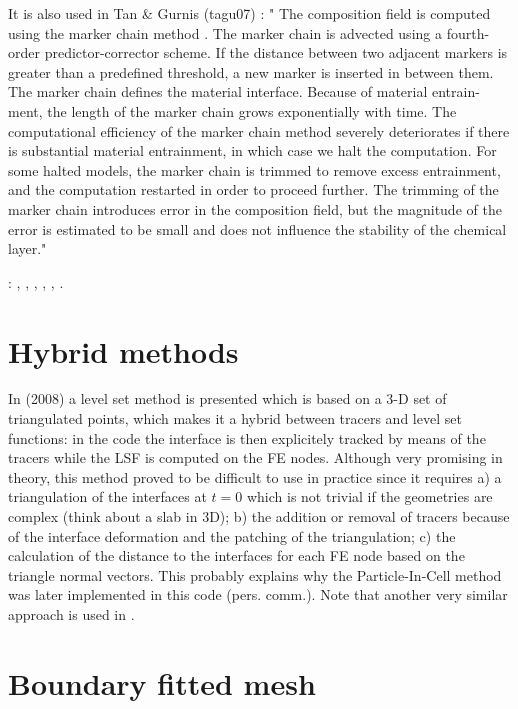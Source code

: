 It is also used in Tan \& Gurnis (tagu07) \cite{tagu07}: "
The composition field is computed using the marker
chain method \cite{dagu86,vaks97}. The marker chain is advected using a fourth-order
predictor-corrector scheme. If the distance between two
adjacent markers is greater than a predefined threshold, a
new marker is inserted in between them. The marker chain
defines the material interface. Because of material entrain-
ment, the length of the marker chain grows exponentially
with time. The computational efficiency of the marker chain
method severely deteriorates if there is substantial material
entrainment, in which case we halt the computation. For
some halted models, the marker chain is trimmed to remove
excess entrainment, and the computation restarted in order
to proceed further. The trimming of the marker chain
introduces error in the composition field, but the magnitude
of the error is estimated to be small and does not influence
the stability of the chemical layer."

\Literature: 
\textcite{zhha03},
\textcite{liva05},
\textcite{liva06a},
\textcite{liva06b},
\textcite{kaus05},
\textcite{mulyukova}.

\section{Hybrid methods}

In \textcite{brtf08} (2008) a level set method is presented which is based on a 3-D set
of triangulated points, which makes it a hybrid between tracers and level set functions:
in the \douar code the interface is then explicitely tracked by means of the tracers while the LSF is computed 
on the FE nodes. Although very promising in theory, this method proved to be difficult to use in practice
since it requires a) a triangulation of the interfaces at $t=0$ which is not trivial if the geometries
are complex (think about a slab in 3D); b) the addition or removal of tracers because of the interface deformation
and the patching of the triangulation; c) the calculation of the distance to the interfaces for each 
FE node based on the triangle normal vectors. 
This probably explains why the Particle-In-Cell method was later implemented in this code (pers. comm.).
Note that another very similar approach is used in \cite{saev10}.

\section{Boundary fitted mesh}

